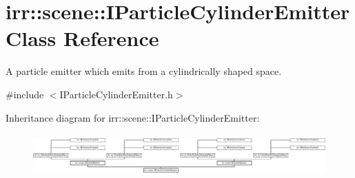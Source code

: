 \hypertarget{classirr_1_1scene_1_1IParticleCylinderEmitter}{}\section{irr\+:\+:scene\+:\+:I\+Particle\+Cylinder\+Emitter Class Reference}
\label{classirr_1_1scene_1_1IParticleCylinderEmitter}


A particle emitter which emits from a cylindrically shaped space.  




{\ttfamily \#include $<$I\+Particle\+Cylinder\+Emitter.\+h$>$}

Inheritance diagram for irr\+:\+:scene\+:\+:I\+Particle\+Cylinder\+Emitter\+:\begin{figure}[H]
\begin{center}
\leavevmode
\includegraphics[height=1.658768cm]{classirr_1_1scene_1_1IParticleCylinderEmitter}
\end{center}
\end{figure}
